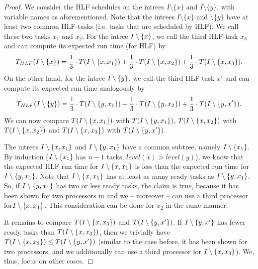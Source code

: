 \begin{proof}
  We consider the HLF schedules on the intrees $I\setminus \{x\}$ and $I \setminus \{y\}$, with variable names as aforementioned. Note that the intrees $I\setminus \{x\}$ and $\setminus \{y\}$ have at least two common HLF-tasks (i.e. tasks that are scheduled by HLF). We call these two tasks $x_1$ and $x_2$. For the intree $I\setminus\{x\}$, we call the third HLF-task $x_3$ and can compute its expected run time (for HLF) by
  \begin{equation*}
    T_{HLF}(I\setminus\{x\}) = 
    \frac{1}{3} \cdot T(I\setminus\{x, x_1\}) +
    \frac{1}{3} \cdot T(I\setminus\{x, x_2\}) +
    \frac{1}{3} \cdot T(I\setminus\{x, x_3\})
    .
  \end{equation*}
  On the other hand, for the intree $I\setminus\{y\}$, we call the third HLF-task $x'$ and can compute its expected run time analogously by
  \begin{equation*}
    T_{HLF}(I\setminus\{y\}) = 
    \frac{1}{3} \cdot T(I\setminus\{y, x_1\}) +
    \frac{1}{3} \cdot T(I\setminus\{y, x_2\}) +
    \frac{1}{3} \cdot T(I\setminus\{y, x'\})
    .
  \end{equation*}
  We can now compare $T(I\setminus\{x, x_1\})$ with $T(I\setminus\{y, x_1\})$, $T(I\setminus\{x, x_2\})$ with $T(I\setminus\{x, x_2\})$ and $T(I\setminus\{x, x_3\})$ with $T(I\setminus\{y, x'\})$.
  
  The intrees $I\setminus\{x,x_1\}$ and $I\setminus\{y,x_1\}$ have a common subtree, namely $I\setminus\{x_1\}$. By induction ($I\setminus\{x_1\}$ has $n-1$ tasks, $level(x) > level(y)$), we know that the expected HLF run time for $I\setminus\{x,x_1\}$ is less than the expected run time for $I\setminus\{y,x_1\}$. Note that $I\setminus\{x, x_1\}$ has at least as many ready tasks as $I\setminus\{y,x_1\}$. So, if $I\setminus\{y,x_1\}$ has two or less ready tasks, the claim is true, because it has been shown for two processors in \cite{chandyreynoldsshortpaper1975} and we -- moreover -- can use a third processor for$I\setminus\{x,x_1\}$. This consideration can be done for $x_2$ in the same manner. 

  It remains to compare $T(I\setminus\{x, x_3\})$ and $T(I\setminus\{y, x'\})$. If $I\setminus\{y,x'\}$ has fewer ready tasks than $T(I\setminus\{x, x_3\})$, then we trivially have $T(I\setminus\{x, x_3\}) \leq T(I\setminus\{y, x'\})$ (similar to the case before, it has been shown for two processors, and we additionally can use a third processor for $I\setminus\{x,x_3\}$). We, thus, focus on other cases.


\end{proof}
